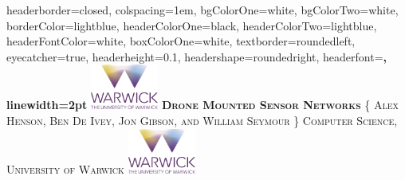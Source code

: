 \documentclass[landscape,a0paper,fontscale=0.285]{baposter} %
\begin{document}
\begin{poster}
{
headerborder=closed, %
colspacing=1em, %
bgColorOne=white, %
bgColorTwo=white, %
borderColor=lightblue, %
headerColorOne=black, %
headerColorTwo=lightblue, %
headerFontColor=white, %
boxColorOne=white, %
textborder=roundedleft, %
eyecatcher=true, %
headerheight=0.1\textheight, %
headershape=roundedright, %
headerfont=\Large\bf\textsc, %
linewidth=2pt %
}
%
{\includegraphics[height=4em]{logo.png}} %
{\bf\textsc{Drone Mounted Sensor Networks}\vspace{0.5em}} %
{\textsc{\{ Alex Henson, Ben De Ivey, Jon Gibson, and William Seymour \} \hspace{12pt} Computer Science, University of Warwick}} %
{\includegraphics[height=4em]{logo.png}} %



\end{poster}
\end{document}
